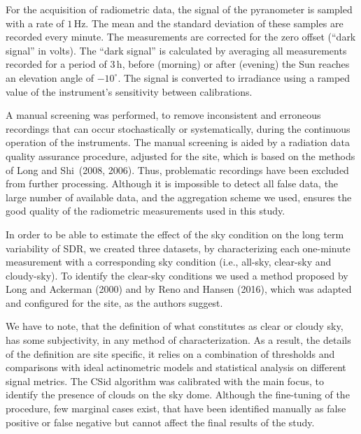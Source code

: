 \documentclass[
  preprint, 3p, authoryear]{article}
\begin{document}
For the acquisition of radiometric data, the signal of the pyranometer is sampled with a rate of \(1\,\text{Hz}\).
The mean and the standard deviation of these samples are recorded every minute.
The measurements are corrected for the zero offset (``dark signal'' in volts).
The ``dark signal'' is calculated by averaging all measurements recorded for a period of
\(3\,\text{h}\),
before (morning) or after (evening) the Sun reaches an elevation angle of
\(-10^\circ\).
The signal is converted to irradiance using a ramped value of the instrument's sensitivity between calibrations.

A manual screening was performed, to remove inconsistent and erroneous recordings that can occur stochastically or systematically, during the continuous operation of the instruments.
The manual screening is aided by a radiation data quality assurance procedure, adjusted for the site, which is based on the methods of
Long and Shi~(2008, 2006).
Thus, problematic recordings have been excluded from further processing.
Although it is impossible to detect all false data, the large number of available data, and the aggregation scheme we used, ensures the good quality of the radiometric measurements used in this study.

In order to be able to estimate the effect of the sky condition on the long term variability of SDR, we created three datasets, by characterizing each one-minute measurement with a corresponding sky condition (i.e., all-sky, clear-sky and cloudy-sky).
To identify the clear-sky conditions we used a method proposed by
Long and Ackerman (2000)
and by
Reno and Hansen (2016),
which was adapted and configured for the site, as the authors suggest.

We have to note, that the definition of what constitutes as clear or cloudy sky, has some subjectivity, in any method of characterization.
As a result, the details of the definition are site specific, it relies on a combination of thresholds and comparisons with ideal actinometric models and statistical analysis on different signal metrics.
The CSid algorithm was calibrated with the main focus, to identify the presence of clouds on the sky dome.
Although the fine-tuning of the procedure, few marginal cases exist, that have been identified manually as false positive or false negative but cannot affect the final results of the study.
\end{document}
